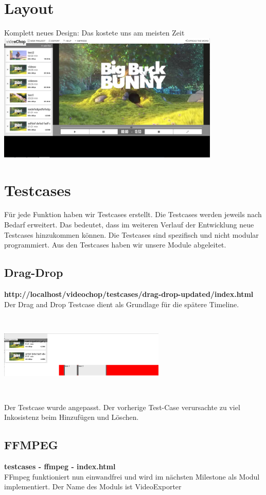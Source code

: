 \documentclass[a4paper,10pt]{scrartcl}
\begin{document}
\section{Layout}
Komplett neues Design: Das kostete uns am meisten Zeit\\
\includegraphics[width=400px]{images/layout.png}\\
\newpage
\section{Testcases}
Für jede Funktion haben wir Testcases erstellt. Die Testcases werden jeweils nach Bedarf erweitert. Das bedeutet, dass im weiteren Verlauf der Entwicklung neue Testcases hinzukommen können. Die Testcases sind spezifisch und nicht modular programmiert. Aus den Testcases haben wir unsere Module abgeleitet.
\subsection{Drag-Drop}
\textbf{http://localhost/videochop/testcases/drag-drop-updated/index.html} \\
Der Drag and Drop Testcase dient als Grundlage für die spätere Timeline.\\
\includegraphics[height=176px, width=300px]{images/draganddrop.png}\\
Der Testcase wurde angepasst. Der vorherige Test-Case verursachte zu viel Inkosistenz beim Hinzufügen und Löschen.
\subsection{FFMPEG}
\textbf{testcases - ffmpeg - index.html} \\
FFmpeg funktioniert nun einwandfrei und wird im nächsten Milestone als Modul implementiert. Der Name des Moduls ist VideoExporter
\newpage
\end{document}
